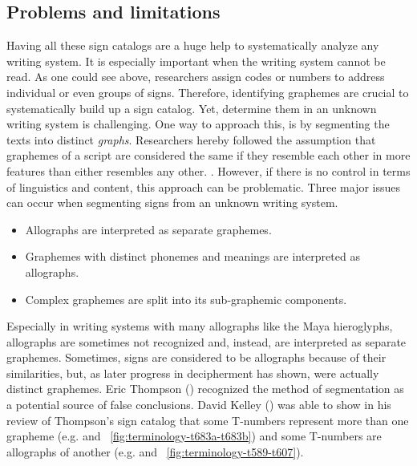 \documentclass[../main.tex]{subfiles}
\begin{document}
\subsection{Problems and limitations}
Having all these sign catalogs are a huge help to systematically analyze any writing system.
It is especially important when the writing system cannot be read.
As one could see above, researchers assign codes or numbers to address individual or 
even groups of signs.
Therefore, identifying graphemes are crucial to systematically build up a sign catalog.
Yet, determine them in an unknown writing system is challenging.
One way to approach this, is by segmenting the texts into distinct \emph{graphs}.
Researchers hereby followed the assumption that graphemes of a script are considered the same if 
they resemble each other in more features than either resembles any other.
.
However, if there is no control in terms of linguistics and content, 
this approach can be problematic.
Three major issues can occur when segmenting signs from an unknown writing system.
\begin{itemize}
    \item Allographs are interpreted as separate graphemes.
    \item Graphemes with distinct phonemes and meanings are interpreted as allographs.
    \item Complex graphemes are split into its sub-graphemic components.
\end{itemize}
Especially in writing systems with many allographs like the Maya hieroglyphs,
allographs are sometimes not recognized and, instead, are interpreted as separate graphemes. 
Sometimes, signs are considered to be allographs because of their similarities, 
but, as later progress in decipherment has shown, were actually distinct graphemes.
Eric Thompson (\cite[12\psq]{thompson1962catalog}) recognized the method of segmentation as 
a potential source of false conclusions.
David Kelley (\cite{kelley1962}) was able to show in his review of Thompson's sign catalog that
some T-numbers represent more than one grapheme 
(e.g.  and ~\ref{fig:terminology-t683a-t683b}) 
and some T-numbers are allographs of another 
(e.g.  and ~\ref{fig:terminology-t589-t607}).
\end{document}
